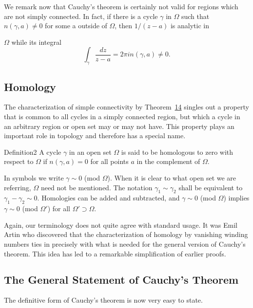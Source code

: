 We remark now that Cauchy's theorem is certainly not valid for regions which are not simply connected. In fact, if there is a cycle $\gamma$ in $\Omega$ such that $n(\gamma,a) \neq 0$ for some a outside of $\Omega$, then $1/(z - a)$ is analytic in


$\Omega$ while its integral
\begin{equation*}
\int_ {\gamma} \frac {d z}{z - a} = 2 \pi i n (\gamma , a) \neq 0.
\end{equation*}
\setcounter{section}{4}\setcounter{subsection}{2}\subsection{Homology}\label{sec:4.4.3}
The characterization of simple connectivity by Theorem~\hyperref[thm:4.14]{14} singles out a property that is common to all cycles in a simply connected region, but which a cycle in an arbitrary region or open set may or may not have. This property plays an important role in topology and therefore has a special name.

\begin{originalstatement}{Definition}{2}\label{def:4.2}
A cycle $\gamma$ in an open set $\Omega$ is said to be homologous to zero with respect to $\Omega$ if $n(\gamma, a) = 0$ for all points $a$ in the complement of $\Omega$.
\end{originalstatement}
In symbols we write $\gamma \sim 0$ (mod $\Omega$). When it is clear to what open set we are referring, $\Omega$ need not be mentioned. The notation $\gamma_1 \sim \gamma_2$ shall be equivalent to $\gamma_1 - \gamma_2 \sim 0$. Homologies can be added and subtracted, and $\gamma \sim 0$ (mod $\Omega$) implies $\gamma \sim 0$ (mod $\Omega'$) for all $\Omega' \supset \Omega$.

Again, our terminology does not quite agree with standard usage. It was Emil Artin who discovered that the characterization of homology by vanishing winding numbers ties in precisely with what is needed for the general version of Cauchy's theorem. This idea has led to a remarkable simplification of earlier proofs.

\setcounter{section}{4}\setcounter{subsection}{3}\subsection{The General Statement of Cauchy's Theorem}\label{sec:4.4.4}
The definitive form of Cauchy's theorem is now very easy to state.

